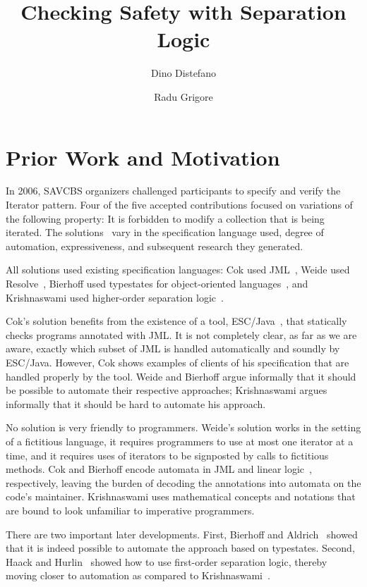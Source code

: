 \documentclass[a4paper]{article}
\title{Checking Safety with Separation Logic}
\author{Dino Distefano \and Radu Grigore}
\theoremstyle{remark}
\begin{document}
\maketitle
\section{Prior Work and Motivation}

In 2006, SAVCBS organizers challenged participants to specify and verify the Iterator pattern.
Four of the five accepted contributions focused on variations of the following property:
It is forbidden to modify a collection that is being iterated.
The solutions~\cite{cok2006,weide2006,bierhoff2006,krishnaswami2006} vary in the specification language used, degree of automation, expressiveness, and subsequent research they generated.

All solutions used existing specification languages:
Cok used JML~\cite{jml}, Weide used Resolve~\cite{resolve}, Bierhoff used typestates for object-oriented languages~\cite{deline2004}, and Krishnaswami used higher-order separation logic~\cite{biering2007}.

Cok's solution benefits from the existence of a tool, ESC/Java~\cite{escjava}, that statically checks programs annotated with JML\null.
It is not completely clear, as far as we are aware, exactly which subset of JML is handled automatically and soundly by ESC/Java.
However, Cok shows examples of clients of his specification that are handled properly by the tool.
Weide and Bierhoff argue informally that it should be possible to automate their respective approaches;
Krishnaswami argues informally that it should be hard to automate his approach.

No solution is very friendly to programmers. 
Weide's solution works in the setting of a fictitious language, it requires programmers to use at most one iterator at a time, and it requires uses of iterators to be signposted by calls to fictitious methods.
Cok and Bierhoff encode automata in JML and linear logic~\cite{girard1987}, respectively, leaving the burden of decoding the annotations into automata on the code's maintainer.
Krishnaswami uses mathematical concepts and notations that are bound to look unfamiliar to imperative programmers.

There are two important later developments. First, Bierhoff and Aldrich~\cite{bierhoff2007} showed that it is indeed possible to automate the approach based on typestates. Second, Haack and Hurlin~\cite{haack2009} showed how to use first-order separation logic, thereby moving closer to automation as compared to Krishnaswami~\cite{krishnaswami2006}.
\end{document}
